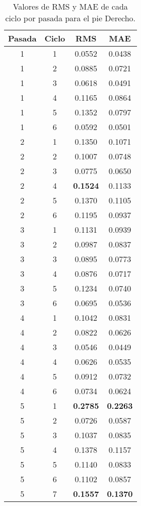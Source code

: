 \begin{table}[H]
\centering
\renewcommand{\arraystretch}{1.2}
\begin{tabular}{|c|c|c|c|}
\hline
\textbf{Pasada} & \textbf{Ciclo} & \textbf{RMS} & \textbf{MAE} \\
\hline
1 & 1 & 0.0552 & 0.0438 \\
\hline
1 & 2 & 0.0885 & 0.0721 \\
\hline
1 & 3 & 0.0618 & 0.0491 \\
\hline
1 & 4 & 0.1165 & 0.0864 \\
\hline
1 & 5 & 0.1352 & 0.0797 \\
\hline
1 & 6 & 0.0592 & 0.0501 \\
\hline
2 & 1 & 0.1350 & 0.1071 \\
\hline
2 & 2 & 0.1007 & 0.0748 \\
\hline
2 & 3 & 0.0775 & 0.0650 \\
\hline
2 & 4 & \textbf{0.1524} & 0.1133 \\
\hline
2 & 5 & 0.1370 & 0.1105 \\
\hline
2 & 6 & 0.1195 & 0.0937 \\
\hline
3 & 1 & 0.1131 & 0.0939 \\
\hline
3 & 2 & 0.0987 & 0.0837 \\
\hline
3 & 3 & 0.0895 & 0.0773 \\
\hline
3 & 4 & 0.0876 & 0.0717 \\
\hline
3 & 5 & 0.1234 & 0.0740 \\
\hline
3 & 6 & 0.0695 & 0.0536 \\
\hline
4 & 1 & 0.1042 & 0.0831 \\
\hline
4 & 2 & 0.0822 & 0.0626 \\
\hline
4 & 3 & 0.0546 & 0.0449 \\
\hline
4 & 4 & 0.0626 & 0.0535 \\
\hline
4 & 5 & 0.0912 & 0.0732 \\
\hline
4 & 6 & 0.0734 & 0.0624 \\
\hline
5 & 1 & \textbf{0.2785} & \textbf{0.2263} \\
\hline
5 & 2 & 0.0726 & 0.0587 \\
\hline
5 & 3 & 0.1037 & 0.0835 \\
\hline
5 & 4 & 0.1378 & 0.1157 \\
\hline
5 & 5 & 0.1140 & 0.0833 \\
\hline
5 & 6 & 0.1102 & 0.0857 \\
\hline
5 & 7 & \textbf{0.1557} & \textbf{0.1370} \\
\hline
\end{tabular}
\caption{Valores de RMS y MAE de cada ciclo por pasada para el pie Derecho.}
\label{tab:rms_mae_pie_derecho}
\end{table}
